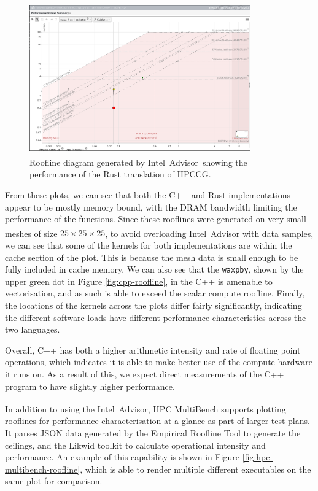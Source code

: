 \begin{figure}[H]
    \centering
    \includegraphics[width=0.85\textwidth]{images/5_performance/rooflines/rust_roofline.png}
    \caption{Roofline diagram generated by Intel\textsuperscript{\textregistered}\ Advisor\ showing the performance of the Rust translation of HPCCG.}
    \label{fig:rust-roofline}
\end{figure}

From these plots, we can see that both the C++ and Rust implementations appear to be mostly memory bound, with the DRAM bandwidth limiting the performance of the functions. Since these rooflines were generated on very small meshes of size $25 \times 25 \times 25$, to avoid overloading Intel\textsuperscript{\textregistered}\ Advisor with data samples, we can see that some of the kernels for both implementations are within the cache section of the plot. This is because the mesh data is small enough to be fully included in cache memory. We can also see that the \texttt{waxpby}, shown by the upper green dot in Figure \ref{fig:cpp-roofline}, in the C++ is amenable to vectorisation, and as such is able to exceed the scalar compute roofline. Finally, the locations of the kernels across the plots differ fairly significantly, indicating the different software loads have different performance characteristics across the two languages.

Overall, C++ has both a higher arithmetic intensity and rate of floating point operations, which indicates it is able to make better use of the compute hardware it runs on. As a result of this, we expect direct measurements of the C++ program to have slightly higher performance.

In addition to using the Intel\textsuperscript{\textregistered}\ Advisor, HPC MultiBench supports plotting rooflines for performance characterisation at a glance as part of larger test plans. It parses JSON data generated by the Empirical Roofline Tool \cite{EmpiricalRooflineTool} to generate the ceilings, and the Likwid toolkit \cite{RRZEHPCLikwid2024} to calculate operational intensity and performance. An example of this capability is shown in Figure \ref{fig:hpc-multibench-roofline}, which is able to render multiple different executables on the same plot for comparison.


